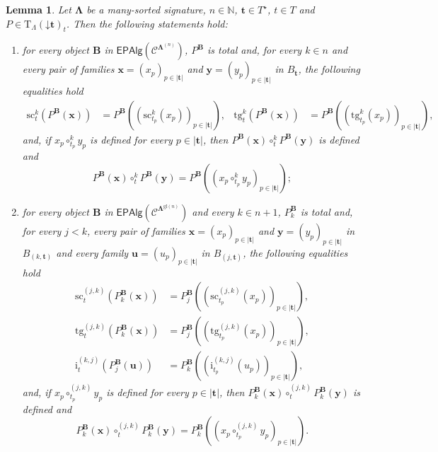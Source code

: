 \documentclass[a4paper, reqno
]{amsart}
\newcommand{\bb}[1]{\ensuremath{\lvert #1 \rvert}}
\newcommand{\vs}[1]{\mathbin{\downarrow}#1}
\newcommand{\sig}[1]{\mathbf{#1}}             %
\newcommand{\spec}[1]{\boldsymbol{\mathcal{#1}}} %
\newcommand{\gl}{\mathrm{gl}}                %
\newcommand{\src}{\mathrm{sc}}
\newcommand{\tgt}{\mathrm{tg}}
\theoremstyle{plain}
\newtheorem{lemma}[theorem]{Lemma}
\theoremstyle{definition}
\begin{document}
\begin{lemma}\label{LTermFunctor}
Let $\sig{\Lambda}$ be a many-sorted signature, $n\in\mathbb{N}$, $\mathbf{t}\in T^{\star}$, $t\in T$ and $P\in\mathrm{T}_{\Lambda}(\vs{\mathbf{t}})_{t}$.
Then the following statements hold:
\begin{enumerate}
\item for every object $\mathbf{B}$ in $\mathsf{EPAlg}(\spec{C}^{\sig{\Lambda}^{(n)}})$, $P^{\mathbf{B}}$ is total and, for every $k\in n$ and every pair of families $\mathbf{x}=(x_{p})_{p\in\bb{\mathbf{t}}}$ and $\mathbf{y}=(y_{p})_{p\in\bb{\mathbf{t}}}$ in $B_{\mathbf{t}}$, the following equalities hold
\begin{align*}
\src^{k}_{t}\left(P^{\mathbf{B}}(\mathbf{x})\right)&=P^{\mathbf{B}}\left(\left(\src^{k}_{t_{p}}(x_{p})\right)_{p\in\bb{\mathbf{t}}}\right),
&
\tgt^{k}_{t}\left(P^{\mathbf{B}}(\mathbf{x})\right)&=P^{\mathbf{B}}\left(\left(\tgt^{k}_{t_{p}}(x_{p})\right)_{p\in\bb{\mathbf{t}}}\right),
\end{align*}
and, if $x_{p}\circ^{k}_{t_{p}}y_{p}$ is defined for every $p\in\bb{\mathbf{t}}$, then $P^{\mathbf{B}}(\mathbf{x})\circ^{k}_{t}P^{\mathbf{B}}(\mathbf{y})$ is defined and
$$
P^{\mathbf{B}}(\mathbf{x})\circ^{k}_{t}P^{\mathbf{B}}(\mathbf{y})=P^{\mathbf{B}}\left(\left(x_{p}\circ^{k}_{t_{p}}y_{p}\right)_{p\in\bb{\mathbf{t}}}\right);
$$
\item for every object $\mathbf{B}$ in $\mathsf{EPAlg}(\spec{C}^{\sig{\Lambda}^{\gl(n)}})$ and every $k\in n+1$, $P_{k}^{\mathbf{B}}$ is total and, for every $j<k$, every pair of families $\mathbf{x}=(x_{p})_{p\in\bb{\mathbf{t}}}$ and $\mathbf{y}=(y_{p})_{p\in\bb{\mathbf{t}}}$ in $B_{(k,\mathbf{t})}$ and every family $\mathbf{u}=(u_{p})_{p\in\bb{\mathbf{t}}}$ in $B_{(j,\mathbf{t})}$, the following equalities hold
\begin{align*}
\src^{(j,k)}_{t}\left(P_{k}^{\mathbf{B}}(\mathbf{x})\right)&=P_{j}^{\mathbf{B}}\left(\left(\src^{(j,k)}_{t_{p}}(x_{p})\right)_{p\in\bb{\mathbf{t}}}\right),
\\
\tgt^{(j,k)}_{t}\left(P_{k}^{\mathbf{B}}(\mathbf{x})\right)&=P_{j}^{\mathbf{B}}\left(\left(\tgt^{(j,k)}_{t_{p}}(x_{p})\right)_{p\in\bb{\mathbf{t}}}\right),
\\
\mathrm{i}^{(k,j)}_{t}\left(P_{j}^{\mathbf{B}}(\mathbf{u})\right)&=P_{k}^{\mathbf{B}}\left(\left(\mathrm{i}^{(k,j)}_{t_{p}}(u_{p})\right)_{p\in\bb{\mathbf{t}}}\right),
\end{align*}
and, if $x_{p}\circ^{(j,k)}_{t_{p}}y_{p}$ is defined for every $p\in\bb{\mathbf{t}}$, then $P_{k}^{\mathbf{B}}(\mathbf{x})\circ^{(j,k)}_{t}P_{k}^{\mathbf{B}}(\mathbf{y})$ is defined and
$$
P_{k}^{\mathbf{B}}(\mathbf{x})\circ^{(j,k)}_{t}P_{k}^{\mathbf{B}}(\mathbf{y})=P_{k}^{\mathbf{B}}\left(\left(x_{p}\circ^{(j,k)}_{t_{p}}y_{p}\right)_{p\in\bb{\mathbf{t}}}\right).
$$
\end{enumerate}
\end{lemma}
\end{document}
